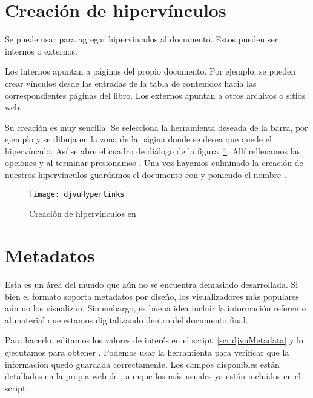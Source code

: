 \documentclass[%
	a5paper,
	10pt,
	twoside,
	openright,
	final,
]{memoir}
\begin{document}
{	

	\section{Creación de hipervínculos\label{sec:djvuHyperlinks}} Se puede usar \djvueditor para agregar hipervínculos al documento. Estos pueden ser internos o externos.
	
	Los internos apuntan a páginas del propio documento. Por ejemplo, se pueden crear vínculos desde las entradas de la tabla de contenidos hacia las correspondientes páginas del libro. Los externos apuntan a otros archivos o sitios web.
	
	Su creación es muy sencilla. Se selecciona la herramienta deseada de la barra, por ejemplo  y se dibuja en la zona de la página donde se desea que quede el hipervínculo. Así se abre el cuadro de diálogo de la figura~\ref{fig:djvuHyperlinks}. Allí rellenamos las opciones y al terminar presionamos . Una vez hayamos culminado la creación de nuestros hipervínculos guardamos el documento con  y poniendo el nombre .

	\begin{figure}
		\texttt{[image: djvuHyperlinks]}
		\caption{Creación de hipervínculos en \djvueditor\label{fig:djvuHyperlinks}}
	\end{figure}

	\section{Metadatos\label{sec:djvuMetadata}} Esta es un área del mundo \djvu que aún no se encuentra demasiado desarrollada. Si bien el formato soporta metadatos por diseño, los visualizadores más populares aún no los visualizan. Sin embargo, es buena idea incluir la información referente al material que estamos digitalizando dentro del documento final.

	Para hacerlo, editamos los valores de interés en el script~\ref{scr:djvuMetadata} y lo ejecutamos para obtener . Podemos usar la herramienta \exiftool para verificar que la información quedó guardada correctamente. Los campos disponibles están detallados en la propia web de \exiftool \cite{DjVuTags}, aunque los más usuales ya están incluidos en el script.

}
\end{document}

